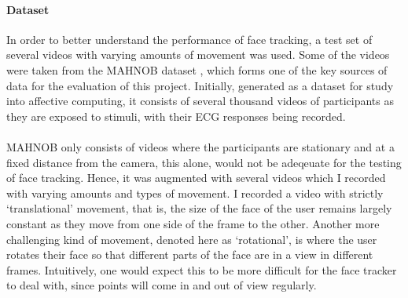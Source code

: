 \paragraph{Dataset}
In order to better understand the performance of face tracking, a test set of several videos with varying amounts of movement was used. Some of the videos were taken from the MAHNOB dataset \cite{Mahnob}, which forms one of the key sources of data for the evaluation of this project.
Initially, generated as a dataset for study into affective computing, it consists of several thousand videos of participants as they are exposed to stimuli, with their ECG responses being recorded. 
\\\\
MAHNOB \cite{Mahnob} only consists of videos where the participants are stationary and at a fixed distance from the camera, this alone, would not be adeqeuate for the testing of face tracking. Hence, it was augmented with several videos which I recorded with varying amounts and types of movement.
I recorded a video with strictly `translational' movement, that is, the size of the face of the user remains largely constant as they move from one side of the frame to the other.
Another more challenging kind of movement, denoted here as `rotational', is where the user rotates their face so that different parts of the face are in a view in different frames.
Intuitively, one would expect this to be more difficult for the face tracker to deal with, since points will come in and out of view regularly.
